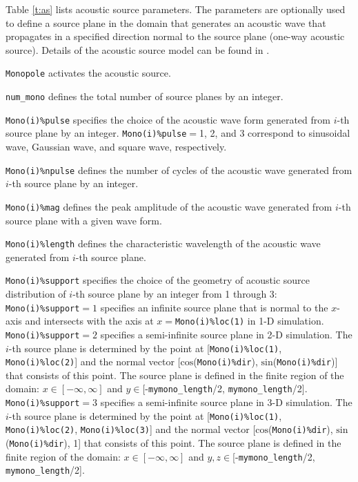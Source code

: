 \documentclass[11pt]{article}
\begin{document}
Table \ref{t:as} lists acoustic source parameters. The parameters are optionally used to define a source plane in the domain that generates an acoustic wave that propagates in a specified direction normal to the source plane (one-way acoustic source). Details of the acoustic source model can be found in \citet{Maeda17}.

\texttt{Monopole} activates the acoustic source.

\texttt{num\_mono} defines the total number of source planes by an integer.

\texttt{Mono(i)\%pulse} specifies the choice of the acoustic wave form generated from $i$-th source plane by an integer.
\texttt{Mono(i)\%pulse}$=$1, 2, and 3 correspond to sinusoidal wave, Gaussian wave, and square wave, respectively.

\texttt{Mono(i)\%npulse} defines the number of cycles of the acoustic wave generated from $i$-th source plane by an integer.

\texttt{Mono(i)\%mag} defines the peak amplitude of the acoustic wave generated from $i$-th source plane with a given wave form.

\texttt{Mono(i)\%length} defines the characteristic wavelength of the acoustic wave generated from $i$-th source plane.

\texttt{Mono(i)\%support} specifies the choice of the geometry of acoustic source distribution of $i$-th source plane by an integer from 1 through 3:\\
\texttt{Mono(i)\%support}$=1$ specifies an infinite source plane that is normal to the $x$-axis and intersects with the axis at $x=$\texttt{Mono(i)\%loc(1)} in 1-D simulation.\\
\texttt{Mono(i)\%support}$=2$ specifies a semi-infinite source plane in 2-D simulation.
The $i$-th source plane is determined by the point at [\texttt{Mono(i)\%loc(1)}, \texttt{Mono(i)\%loc(2)}] and the normal vector [$\mathrm{cos}$(\texttt{Mono(i)\%dir}), $\mathrm{sin}$(\texttt{Mono(i)\%dir})] that consists of this point. 
The source plane is defined in the finite region of the domain: $x\in[-\infty,\infty]$ and $y\in$[-\texttt{mymono\_length}/2, \texttt{mymono\_length}/2].\\
\texttt{Mono(i)\%support}$=3$ specifies a semi-infinite source plane in 3-D simulation.
The $i$-th source plane is determined by the point at [\texttt{Mono(i)\%loc(1)}, \texttt{Mono(i)\%loc(2)}, \texttt{Mono(i)\%loc(3)}] and the normal vector [$\mathrm{cos}$(\texttt{Mono(i)\%dir}), $\mathrm{sin}$(\texttt{Mono(i)\%dir}), 1] that consists of this point.
The source plane is defined in the finite region of the domain: $x\in[-\infty,\infty]$ and $y,z\in$[-\texttt{mymono\_length}/2, \texttt{mymono\_length}/2].
\end{document}
